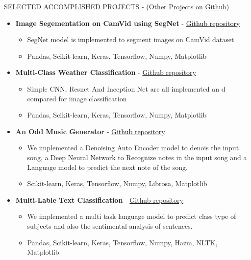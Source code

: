 \documentclass[]{CV}
\begin{document}
\begin{section}{SELECTED ACCOMPLISHED PROJECTS { - (Other Projects on \href{https://github.com/amirkasaei}{Github})}}
\begin{itemize}
\item \textbf{Image Segementation on CamVid using SegNet} - \href{https://github.com/amirkasaei/Image-Segementation-CamVid-using-SegNet}{Github repository}
   \begin{itemize}
        \item SegNet model is implemented to segment images on CamVid dataset
        \item Pandas, Scikit-learn, Keras, Tensorflow, Numpy, Matplotlib
    \end{itemize}
    
     \item \textbf{Multi-Class Weather Classification} - \href{https://github.com/amirkasaei/Multi-Class-Weather-Classification}{Github repository}
   \begin{itemize}
        \item Simple CNN, Resnet And Inception Net are all implemented an d compared for image classification
        \item  Pandas, Scikit-learn, Keras, Tensorflow, Numpy, Matplotlib
    \end{itemize}
    
\pagebreak  
\item \textbf{An Odd Music Generator} - \href{https://github.com/amirkasaei/An-Odd-Music-Generator}{Github repository}
   \begin{itemize}
        \item We implemented a Denoising Auto Encoder model to denois the input song, a Deep Neural Network to Recognize notes in the input song and a Language model to predict the next note of  the song.\vspace{-2mm}
        \item Scikit-learn, Keras, Tensorflow, Numpy, Librosa, Matplotlib
    \end{itemize} 
    
    
   \item \textbf{Multi-Lable Text Classification} - \href{https://github.com/amirkasaei/Multi-Lable-Text-Classification}{Github repository}
   \begin{itemize}
        \item We implemented a multi task language model to predict class type of subjects and also the sentimental analysis of sentences.\vspace{-2mm}
        \item Pandas, Scikit-learn, Keras, Tensorflow, Numpy, Hazm, NLTK, Matplotlib
    \end{itemize}


\end{itemize}
\end{section}
\end{document}
